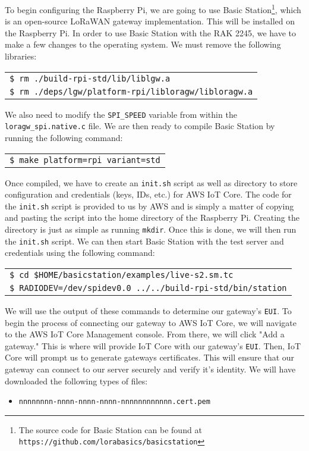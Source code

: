 To begin configuring the Raspberry Pi, we are going to use Basic Station\footnote{The source code for Basic Station can be found at \texttt{https://github.com/lorabasics/basicstation}}, which is an open-source LoRaWAN gateway implementation. This will be installed on the Raspberry Pi. In order to use Basic Station with the RAK 2245, we have to make a few changes to the operating system. We must remove the following libraries:

\begin{tabular}{l}
     \texttt{\$ rm ./build-rpi-std/lib/liblgw.a} \\
     \texttt{\$ rm ./deps/lgw/platform-rpi/libloragw/libloragw.a} \\
\end{tabular}

We also need to modify the \texttt{SPI\_SPEED} variable from within the \\ \texttt{loragw\_spi.native.c} file. We are then ready to compile Basic Station by running the following command:

\begin{tabular}{l}
     \texttt{\$ make platform=rpi variant=std} \\
\end{tabular}

Once compiled, we have to create an \texttt{init.sh} script as well as directory to store configuration and credentials (keys, IDs, etc.) for AWS IoT Core. The code for the \texttt{init.sh} script is provided to us by AWS and is simply a matter of copying and pasting the script into the home directory of the Raspberry Pi. Creating the directory is just as simple as running \texttt{mkdir}. Once this is done, we will then run the \texttt{init.sh} script. We can then start Basic Station with the test server and credentials using the following command:

\begin{tabular}{l}
     \texttt{\$ cd \$HOME/basicstation/examples/live-s2.sm.tc} \\
     \texttt{\$ RADIODEV=/dev/spidev0.0 ../../build-rpi-std/bin/station} \\
\end{tabular}

We will use the output of these commands to determine our gateway's \texttt{EUI}. To begin the process of connecting our gateway to AWS IoT Core, we will navigate to the AWS IoT Core Management console. From there, we will click "Add a gateway." This is where will provide IoT Core with our gateway's \texttt{EUI}. Then, IoT Core will prompt us to generate gateways certificates. This will ensure that our gateway can connect to our server securely and verify it's identity. We will have downloaded the following types of files:

\begin{itemize}
    \item \texttt{nnnnnnnn-nnnn-nnnn-nnnn-nnnnnnnnnnnn.cert.pem}
\end{itemize}